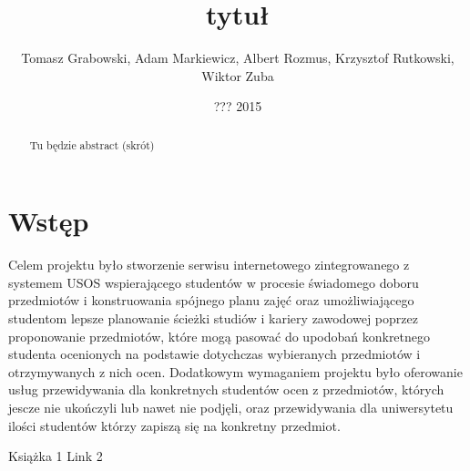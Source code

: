 \documentclass[licencjacka]{pracamgr}
\author{Tomasz Grabowski, Adam Markiewicz, Albert Rozmus, Krzysztof Rutkowski, Wiktor Zuba}
\title{tytuł}
\date{??? 2015}
\begin{document}
\maketitle
\begin{abstract}
Tu będzie abstract (skrót)
\end{abstract}
\tableofcontents
\chapter*{Wstęp}

Celem projektu było stworzenie serwisu internetowego zintegrowanego z systemem USOS 
wspierającego studentów w procesie świadomego doboru przedmiotów i konstruowania spójnego planu zajęć oraz
umożliwiającego studentom lepsze planowanie ścieżki studiów i kariery zawodowej
poprzez proponowanie przedmiotów, które mogą pasować do upodobań konkretnego studenta ocenionych na podstawie dotychczas wybieranych przedmiotów i otrzymywanych z nich ocen.
Dodatkowym wymaganiem projektu było oferowanie usług przewidywania dla konkretnych studentów ocen z przedmiotów, których jescze nie ukończyli lub nawet nie podjęli,
oraz przewidywania dla uniwersytetu ilości studentów którzy zapiszą się na konkretny przedmiot.



\begin{thebibliography}{99}
 Książka 1
 Link 2
\end{thebibliography}
\end{document}
